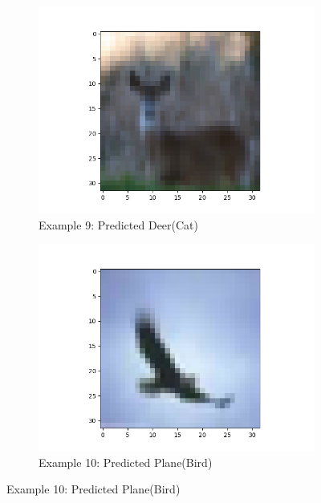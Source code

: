 \documentclass[11pt]{article}
\begin{document}
\begin{figure}[H]
\begin{subfigure}[b]{0.3\textwidth}
        \includegraphics[width=\linewidth]{misB9.png}
        \caption{Example 9: Predicted Deer(Cat)}
    \end{subfigure}
    \hfill
    \begin{subfigure}[b]{0.3\textwidth}
        \centering
        \includegraphics[width=\linewidth]{misB10.png}
        \caption{Example 10: Predicted Plane(Bird)}
    \end{subfigure} 
\end{figure}
\newpage
\end{document}
